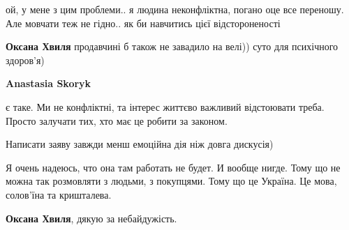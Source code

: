 \begin{itemize}
\begin{itemize}
 

ой, у мене з цим проблеми.. я людина неконфліктна, погано оце все переношу. Але
мовчати теж не гідно.. як би навчитись цієї відстороненості

 
\textbf{Оксана Хвиля} продавчині б також не завадило на велі)) суто для психічного здоров'я)

 
\textbf{Anastasia Skoryk} 

є таке. Ми не конфліктні, та інтерес життєво важливий відстоювати треба. Просто
залучати тих, хто має це робити за законом.

Написати заяву завжди менш емоційна дія ніж довга дискусія)

\end{itemize}

 

Я очень надеюсь, что она там работать не будет. И вообще нигде. Тому що не
можна так розмовляти з людьми, з покупцями. Тому що це Україна. Це мова,
солов'їна та кришталева.

\textbf{Оксана Хвиля}, дякую за небайдужість.

\begin{itemize}
 

\end{itemize}
\end{itemize}
